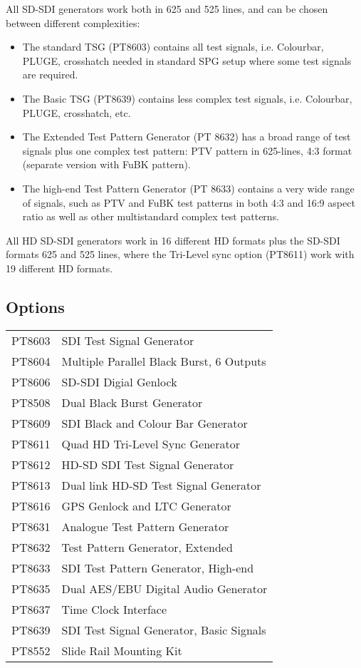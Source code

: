 All SD-SDI generators work both in 625 and 525 lines, and can be chosen between different complexities:
\begin{itemize}
\item The standard TSG (PT8603) contains all test signals, i.e. Colourbar, PLUGE, crosshatch needed in standard SPG setup where some test signals are required.
\item The Basic TSG (PT8639) contains less complex test signals, i.e. Colourbar, PLUGE, crosshatch, etc.
\item The Extended Test Pattern Generator (PT 8632) has a broad range of test signals plus one complex test pattern: PTV pattern in 625-lines, 4:3 format (separate version with FuBK pattern).
\item The high-end Test Pattern Generator (PT 8633) contains a very wide range of signals, such as PTV and FuBK test patterns in both 4:3 and 16:9 aspect ratio as well as other multistandard complex test patterns.
\end{itemize}

All HD SD-SDI generators work in 16 different HD formats plus the SD-SDI formats 625 and 525 lines, where the Tri-Level sync option (PT8611) work with 19 different HD formats.

\subsection{Options}
\begin{tabular}{l l}
	PT8603 & SDI Test Signal Generator\\
	PT8604 & Multiple Parallel Black Burst, 6 Outputs\\
	PT8606 & SD-SDI Digial Genlock\\
	PT8508 & Dual Black Burst Generator\\
	PT8609 & SDI Black and Colour Bar Generator\\
	PT8611 & Quad HD Tri-Level Sync Generator\\
	PT8612 & HD-SD SDI Test Signal Generator\\
	PT8613 & Dual link HD-SD Test Signal Generator\\
	PT8616 & GPS Genlock and LTC Generator\\
	PT8631 & Analogue Test Pattern Generator\\
	PT8632 & Test Pattern Generator, Extended\\
	PT8633 & SDI Test Pattern Generator, High-end\\
	PT8635 & Dual AES/EBU Digital Audio Generator\\
	PT8637 & Time Clock Interface\\
	PT8639 & SDI Test Signal Generator, Basic Signals\\
	\rule{0pt}{4ex}
	PT8552 & Slide Rail Mounting Kit\\
\end{tabular}

